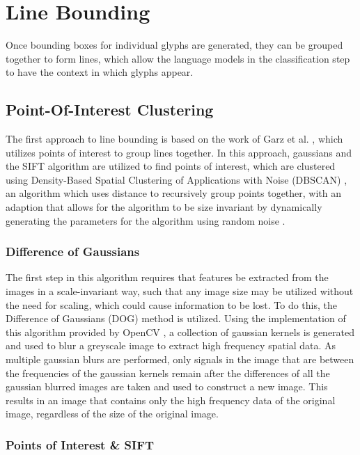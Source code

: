 \section{Line Bounding}

Once bounding boxes for individual glyphs are generated, they can be grouped together to form lines, which allow the language models in the classification step to have the context in which glyphs appear.

\subsection{Point-Of-Interest Clustering}
The first approach to line bounding is based on the work of Garz et al. \cite{Garz2011, Garz2012}, which utilizes points of interest to group lines together. In this approach, gaussians and the SIFT algorithm are utilized to find points of interest, which are clustered using Density-Based Spatial Clustering of Applications with Noise (DBSCAN) \cite{Ester}, an algorithm which uses distance to recursively group points together, with an adaption that allows for the algorithm to be size invariant by dynamically generating the parameters for the algorithm using random noise \cite{Daszykowski}.

\subsubsection{Difference of Gaussians}

The first step in this algorithm requires that features be extracted from the images in a scale-invariant way, such that any image size may be utilized without the need for scaling, which could cause information to be lost. To do this, the Difference of Gaussians (DOG) method is utilized. Using the implementation of this algorithm provided by OpenCV \cite{OpenCV}, a collection of gaussian kernels is generated and used to blur a greyscale image to extract high frequency spatial data. As multiple gaussian blurs are performed, only signals in the image that are between the frequencies of the gaussian kernels remain after the differences of all the gaussian blurred images are taken and used to construct a new image. This results in an image that contains only the high frequency data of the original image, regardless of the size of the original image.

\subsubsection{Points of Interest \& SIFT}

